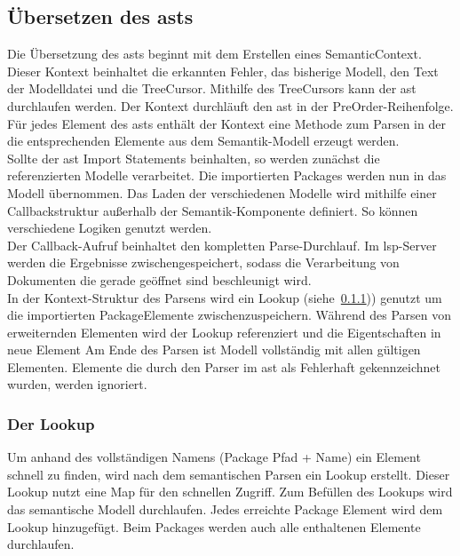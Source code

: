 \documentclass[./einleitung.tex]{subfiles}
\begin{document}
    \subsection{Übersetzen des \acrshort{ast}s}\label{subsec:ubersetzen-des-asts}
    Die Übersetzung des \acrshort{ast}s beginnt mit dem Erstellen eines SemanticContext.
    Dieser Kontext beinhaltet die erkannten Fehler, das bisherige Modell, den Text der Modelldatei und die TreeCursor.
    Mithilfe des TreeCursors kann der \acrshort{ast} durchlaufen werden.
    Der Kontext durchläuft den \acrshort{ast} in der PreOrder-Reihenfolge.
    Für jedes Element des \acrshort{ast}s enthält der Kontext eine Methode zum Parsen in der die entsprechenden Elemente aus dem Semantik-Modell erzeugt werden.\\
    Sollte der \acrshort{ast} Import Statements beinhalten, so werden zunächst die referenzierten Modelle verarbeitet.
    Die importierten Packages werden nun in das Modell übernommen.
    Das Laden der verschiedenen Modelle wird mithilfe einer Callbackstruktur außerhalb der Semantik-Komponente definiert.
    So können verschiedene Logiken genutzt werden. \\
    Der Callback-Aufruf beinhaltet den kompletten Parse-Durchlauf.
    Im \acrshort{lsp}-Server werden die Ergebnisse zwischengespeichert, sodass die Verarbeitung von Dokumenten die gerade geöffnet sind beschleunigt wird.\\
    In der Kontext-Struktur des Parsens wird ein Lookup (siehe~\ref{subsubsec:lookup})) genutzt um die importierten PackageElemente zwischenzuspeichern.
    Während des Parsen von erweiternden Elementen wird der Lookup referenziert und die Eigentschaften in neue Element
    Am Ende des Parsen ist Modell vollständig mit allen gültigen Elementen.
    Elemente die durch den Parser im \acrshort{ast} als Fehlerhaft gekennzeichnet wurden, werden ignoriert.

    \subsubsection{Der Lookup}\label{subsubsec:lookup}
    Um anhand des vollständigen Namens (Package Pfad + Name) ein Element schnell zu finden, wird nach dem semantischen Parsen ein Lookup erstellt.
    Dieser Lookup nutzt eine Map für den schnellen Zugriff.
    Zum Befüllen des Lookups wird das semantische Modell durchlaufen.
    Jedes erreichte Package Element wird dem Lookup hinzugefügt.
    Beim Packages werden auch alle enthaltenen Elemente durchlaufen.
\end{document}
